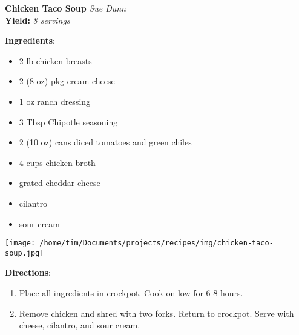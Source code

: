 \documentclass[11pt, twoside, openany]{book}
\begin{document}
\noindent\begin{minipage}[t]{\linewidth}%
{\Large\textbf{Chicken Taco Soup}} \label{chicken-taco-soup}\hfill\textit{Sue Dunn}\\
\textbf{Yield:} \textit{8 servings}\\
\noindent\begin{minipage}[t]{0.78\linewidth}%
\textbf{Ingredients}:\vspace{-3mm}
\begin{multicols}{2}
\begin{itemize}\setlength\itemsep{-1mm}
\item 2 lb chicken breasts
\item 2 (8 oz) pkg cream cheese
\item 1 oz ranch dressing
\item 3 Tbsp Chipotle seasoning
\item 2 (10 oz) cans diced tomatoes and green chiles
\item 4 cups chicken broth
\item grated cheddar cheese
\item cilantro
\item sour cream
\end{itemize}
\end{multicols}
\end{minipage}
\noindent\begin{minipage}[t]{0.18\linewidth}
\centering \strut\vspace*{-\baselineskip}\newline
\texttt{[image: /home/tim/Documents/projects/recipes/img/chicken-taco-soup.jpg]}\\
\end{minipage}\vspace{3mm}
\textbf{Directions}:
\vspace{-3mm}\begin{enumerate}\setlength\itemsep{-1mm}
\item Place all ingredients in crockpot. Cook on low for 6-8 hours.
\item Remove chicken and shred with two forks. Return to crockpot. Serve with cheese, cilantro, and sour cream.
\end{enumerate}
\end{minipage}\vspace{8mm}
\end{document}
